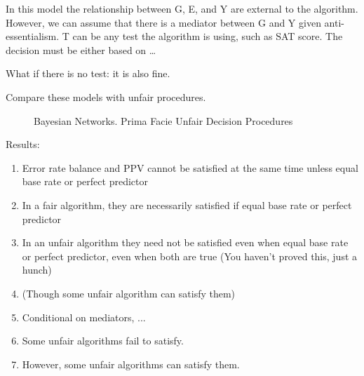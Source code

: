 \documentclass{article}
\begin{document}
In this model the relationship between G, E, and Y are external to the algorithm. However, we can assume that there is a mediator between G and Y given anti-essentialism. T can be any test the algorithm is using, such as SAT score. The decision must be either based on \dots

What if there is no test: it is also fine. 

Compare these models with unfair procedures. 




\begin{figure}[h]
   \caption{Bayesian Networks. Prima Facie Unfair Decision Procedures}
    \label{fig:unfair}
  \end{figure}


  Results:

\begin{enumerate}
  \item Error rate balance and PPV cannot be satisfied at the same time unless equal base rate or perfect predictor
  \item In a fair algorithm, they are necessarily satisfied if equal base rate or perfect predictor
  \item In an unfair algorithm they need not be satisfied even when equal base rate or perfect predictor, even when both are true (You haven't proved this, just a hunch)
  \item (Though some unfair algorithm can satisfy them)
  \item Conditional on mediators, ... 
  \item Some unfair algorithms fail to satisfy.
  \item However, some unfair algorithms can satisfy them.
\end{enumerate}
\end{document}
